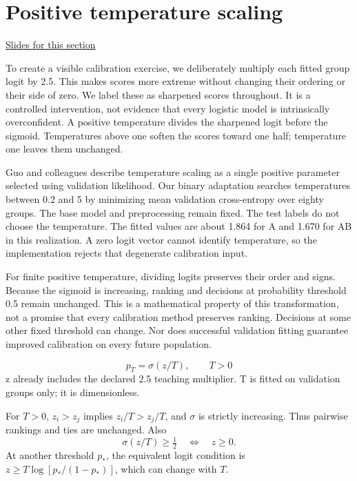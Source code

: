 \documentclass[11pt,letterpaper]{article}
\theoremstyle{definition}\newtheorem{definition}{Definition}\newtheorem{example}{Example}
\numberwithin{equation}{section}
\begin{document}
\section{Positive temperature scaling}
\hypertarget{note-positive-temperature-scaling}{}\label{note:positive-temperature-scaling}
{\small \href{slides.html\#frame=temperature-scaled-probabilities\&step=1}{Slides for this section}}\par
To create a visible calibration exercise, we deliberately multiply each fitted group logit by 2.5. This makes scores more extreme without changing their ordering or their side of zero. We label these as sharpened scores throughout. It is a controlled intervention, not evidence that every logistic model is intrinsically overconfident. A positive temperature divides the sharpened logit before the sigmoid. Temperatures above one soften the scores toward one half; temperature one leaves them unchanged.

Guo and colleagues describe temperature scaling as a single positive parameter selected using validation likelihood. Our binary adaptation searches temperatures between 0.2 and 5 by minimizing mean validation cross-entropy over eighty groups. The base model and preprocessing remain fixed. The test labels do not choose the temperature. The fitted values are about 1.864 for A and 1.670 for AB in this realization. A zero logit vector cannot identify temperature, so the implementation rejects that degenerate calibration input.

For finite positive temperature, dividing logits preserves their order and signs. Because the sigmoid is increasing, ranking and decisions at probability threshold 0.5 remain unchanged. This is a mathematical property of this transformation, not a promise that every calibration method preserves ranking. Decisions at some other fixed threshold can change. Nor does successful validation fitting guarantee improved calibration on every future population.

\[
p_T=\sigma(z/T),\qquad T>0
\]
z already includes the declared 2.5 teaching multiplier. T is fitted on validation groups only; it is dimensionless.

For $T>0$, $z_i>z_j$ implies $z_i/T>z_j/T$, and $\sigma$ is strictly increasing. Thus pairwise rankings and ties are unchanged. Also
\[
 \sigma(z/T)\ge\tfrac12\quad\Longleftrightarrow\quad z\ge0.
\]
At another threshold $p_*$, the equivalent logit condition is $z\ge T\log[p_* /(1-p_*)]$, which can change with $T$.
\end{document}
